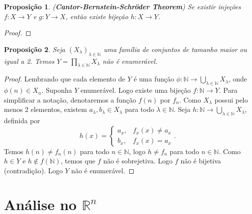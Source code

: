 \documentclass{article}
\theoremstyle{plain}
\newtheorem{prop}{Proposição}[section]
\theoremstyle{definition}
\theoremstyle{remark}
\begin{document}
\begin{prop}
	(\textbf{Cantor-Bernstein-Schröder Theorem}) Se existir injeções $f:X\to Y$ e $g: Y \to X$, então existe bijeção $h:X\to Y$.
\end{prop}
\begin{proof}
\end{proof}
\begin{prop}
	Seja $(X_{\lambda})_{\lambda \in \mathbb{N}}$ uma família de conjuntos de tamanho maior ou igual a 2. Temos $Y = \displaystyle\prod_{\lambda \in \mathbb{N}} X_{\lambda}$ não é enumerável.
\end{prop}
\begin{proof}
	Lembrando que cada elemento de $Y$ é uma função $\phi: \mathbb{N} \to\displaystyle\bigcup_{\lambda \in \mathbb{N}} X_{\lambda}$, onde $\phi(n) \in X_n$. Suponha $Y$ enumerável. Logo existe uma bijeção $f: \mathbb{N} \to Y$. Para simplificar a notação, denotaremos a função $f(n)$ por $f_n$.  Como $X_{\lambda}$ possui pelo menos 2 elementos, existem $a_\lambda, b_\lambda \in X_{\lambda}$ para todo $\lambda\in \mathbb{N}$. Seja $h: \mathbb{N} \to \displaystyle\bigcup_{\lambda \in \mathbb{N}} X_{\lambda}$, definida por $$h(x) = \begin{cases} a_x , & f_x(x) \neq a_x\\ b_x, & f_x(x) = a_x \end{cases}.$$
		Temos $h(n) \neq f_n(n)$ para todo $n\in \mathbb{N}$, logo $h \neq f_n$ para todo $n\in \mathbb{N}$. Como $h\in Y$ e $h \not \in f(\mathbb{N})$, temos que $f$ não é sobrejetiva. Logo $f$ não é bijetiva (contradição). Logo $Y$ não é enumerável.
\end{proof}



\section{Análise no $\mathbb{R}^n$}
\end{document}
